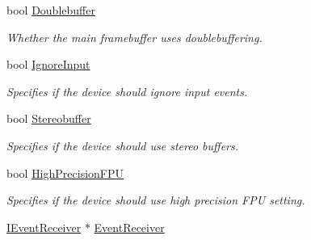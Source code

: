 \begin{DoxyCompactItemize}
bool \hyperlink{structirr_1_1SIrrlichtCreationParameters_a49f2c3ed6cc7a28f2fde6683ac0b3267}{Doublebuffer}
\begin{DoxyCompactList}\small\item\em Whether the main framebuffer uses doublebuffering. \end{DoxyCompactList}\item 
bool \hyperlink{structirr_1_1SIrrlichtCreationParameters_acf9aee48aa9193f025f5f855d5a147cb}{Ignore\+Input}
\begin{DoxyCompactList}\small\item\em Specifies if the device should ignore input events. \end{DoxyCompactList}\item 
bool \hyperlink{structirr_1_1SIrrlichtCreationParameters_ae5dd722bd6c5a7001b73ef92264220a5}{Stereobuffer}
\begin{DoxyCompactList}\small\item\em Specifies if the device should use stereo buffers. \end{DoxyCompactList}\item 
bool \hyperlink{structirr_1_1SIrrlichtCreationParameters_ac790f1359a357f705bc2a5b24a6cc55d}{High\+Precision\+F\+PU}
\begin{DoxyCompactList}\small\item\em Specifies if the device should use high precision F\+PU setting. \end{DoxyCompactList}\item 
\hyperlink{classirr_1_1IEventReceiver}{I\+Event\+Receiver} $\ast$ \hyperlink{structirr_1_1SIrrlichtCreationParameters_a600183dad7a2f6836e585d7a0d4e3e89}{Event\+Receiver}\hypertarget{structirr_1_1SIrrlichtCreationParameters_a600183dad7a2f6836e585d7a0d4e3e89}{}\label{structirr_1_1SIrrlichtCreationParameters_a600183dad7a2f6836e585d7a0d4e3e89}


\end{DoxyCompactItemize}
